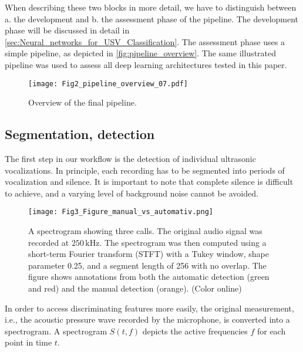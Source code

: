 \documentclass[preprint,NumberedRefs]{JASA}
\begin{document}
When describing these two blocks in more detail, we have to distinguish between a. the development and b. the assessment phase of the pipeline. The development phase will be discussed in detail in \autoref{sec:Neural_networks_for_USV_Classification}. The assessment phase uses a simple pipeline, as depicted in \autoref{fig:pipeline_overview}. The same illustrated pipeline was used to assess all deep learning architectures tested in this paper.

\begin{figure}[ht]
    \begin{center}
    \texttt{[image: Fig2\_pipeline\_overview\_07.pdf]}
    \caption{\label{fig:pipeline_overview}{Overview of the final pipeline.}}
    \end{center}
\end{figure}

\subsection{Segmentation, detection}
\label{sec:Segmentation-Detection}

The first step in our workflow is the detection of individual ultrasonic vocalizations. In principle, each recording has to be segmented into periods of vocalization and silence. It is important to note that complete silence is difficult to achieve, and a varying level of background noise cannot be avoided.

\begin{figure}[ht]
    \begin{center}
    \texttt{[image: Fig3\_Figure\_manual\_vs\_automativ.png]}
    \caption{\label{fig:manual_vs_automativ}{
        A spectrogram showing three calls. The original audio signal was recorded at \(250\,\mathrm{kHz} \). The spectrogram was then computed using a short-term Fourier transform (STFT) with a Tukey window, shape parameter 0.25, and a segment length of 256 with no overlap. The figure shows annotations from both the automatic detection (green and red) and the manual detection (orange). (Color online)}
    }
    \end{center}
\end{figure}

In order to access discriminating features more easily, the original measurement, i.e., the acoustic pressure wave recorded by the microphone, is converted into a spectrogram. A spectrogram $S(t,f)$ depicts the active frequencies $f$ for each point in time $t$.
\end{document}
